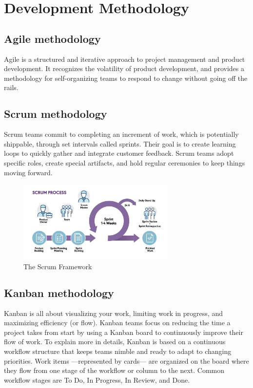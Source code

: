 \section{Development Methodology}
\subsection{Agile methodology}
Agile is a structured and iterative approach to project management and product development.
It recognizes the volatility of product development, and provides a methodology for self-organizing teams to respond to change without going off the rails.

\subsection{Scrum methodology}
Scrum teams commit to completing an increment of work, which is potentially shippable, through set intervals called sprints.
Their goal is to create learning loops to quickly gather and integrate customer feedback.
Scrum teams adopt specific roles, create special artifacts, and hold regular ceremonies to keep things moving forward.


\begin{figure}[H]
    \centering
    \includegraphics[width=0.7\textwidth]{src/assets/chapters/blog-scrum-process-opt.jpg}
    \caption{The Scrum Framework}
    \label{fig:Scrum_Framework_image}
\end{figure}


\subsection{Kanban methodology}
Kanban is all about visualizing your work, limiting work in progress, and maximizing efficiency (or flow).
Kanban teams focus on reducing the time a project takes from start by using a Kanban board to continuously improve their flow of work.
To explain more in details, Kanban is based on a continuous workflow structure that keeps teams nimble and ready to adapt to changing priorities.
Work items —represented by cards— are organized on the board where they flow from one stage of the workflow or column to the next.
Common workflow stages are To Do, In Progress, In Review, and Done.

